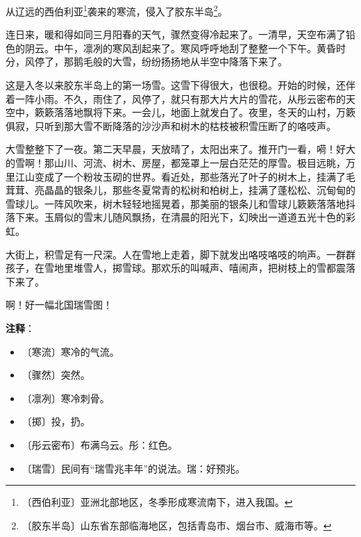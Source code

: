 \documentclass[12pt,UTF-8,openany]{ctexbook}
\begin{document}
\begin{large}
    
    从辽远的西伯利亚\footnote{〔西伯利亚〕亚洲北部地区，冬季形成寒流南下，进入我国。}袭来的寒流，侵入了胶东半岛\footnote{〔胶东半岛〕山东省东部临海地区，包括青岛市、烟台市、威海市等。}。
    
    连日来，暖和得如同三月阳春的天气，骤然变得冷起来了。一清早，天空布满了铅色的阴云。中午，凛冽的寒风刮起来了。寒风呼呼地刮了整整一个下午。黄昏时分，风停了，那鹅毛般的大雪，纷纷扬扬地从半空中降落下来了。
    
    这是入冬以来胶东半岛上的第一场雪。这雪下得很大，也很稳。开始的时候，还伴着一阵小雨。不久，雨住了，风停了，就只有那大片大片的雪花，从彤云密布的天空中，簌簌落落地飘将下来。一会儿，地面上就发白了。夜里，冬天的山村，万簌俱寂，只听到那大雪不断降落的沙沙声和树木的枯枝被积雪压断了的咯吱声。
    
    大雪整整下了一夜。第二天早晨，天放晴了，太阳出来了。推开门一看，嗬！好大的雪啊！那山川、河流、树木、房屋，都笼罩上一层白茫茫的厚雪。极目远眺，万里江山变成了一个粉妆玉砌的世界。看近处，那些落光了叶子的树木上，挂满了毛茸茸、亮晶晶的银条儿，那些冬夏常青的松树和柏树上，挂满了蓬松松、沉甸甸的雪球儿。一阵风吹来，树木轻轻地摇晃着，那美丽的银条儿和雪球儿簌簌落落地抖落下来。玉屑似的雪末儿随风飘扬，在清晨的阳光下，幻映出一道道五光十色的彩虹。
    
    大街上，积雪足有一尺深。人在雪地上走着，脚下就发出咯吱咯吱的响声。一群群孩子，在雪地里堆雪人，掷雪球。那欢乐的叫喊声、嘻闹声，把树枝上的雪都震落下来了。
    
    啊！好一幅北国瑞雪图！
    
\end{large}


\newpage

\textbf{注释}：

\vspace{-1em}

\begin{itemize}
    \setlength\itemsep{-0.2em}
    \item 〔寒流〕寒冷的气流。
    \item 〔骤然〕突然。
    \item 〔凛冽〕寒冷刺骨。
    \item 〔掷〕投，扔。
    \item 〔彤云密布〕布满乌云。彤：红色。
    \item 〔瑞雪〕民间有“瑞雪兆丰年”的说法。瑞：好预兆。
\end{itemize}
\end{document}

